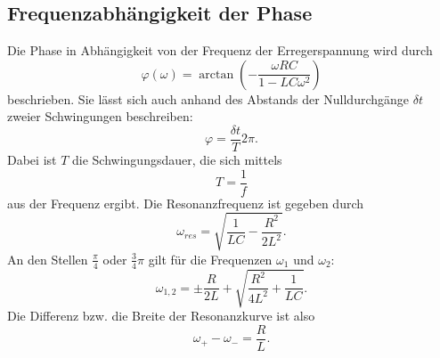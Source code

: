 \subsection{Frequenzabhängigkeit der Phase}
Die Phase in Abhängigkeit von der Frequenz der Erregerspannung wird durch
\begin{equation*}
    \varphi(\omega) = \arctan(-\frac{\omega RC}{1-LC\omega^2})
\end{equation*}
beschrieben.
Sie lässt sich auch anhand des Abstands der Nulldurchgänge $\delta t$ zweier Schwingungen beschreiben:
\begin{equation}
    \varphi = \frac{\delta t}{T} 2 \pi.
    \label{eqn:phi}
\end{equation}
Dabei ist $T$ die Schwingungsdauer, die sich mittels
\begin{equation*}
    T = \frac{1}{f}
\end{equation*}
aus der Frequenz ergibt.
Die Resonanzfrequenz ist gegeben durch
\begin{equation}
    \omega_{res} = \sqrt{\frac{1}{LC} - \frac{R^2}{2L^2}}.
    \label{eqn:omega_res}
\end{equation}
An den Stellen $\frac{\pi}{4}$ oder $\frac{3}{4} \pi$ gilt für die Frequenzen $\omega_{1}$
und $\omega_{2}$:
\begin{equation}
    \omega_{1,2} = \pm \frac{R}{2L} + \sqrt{\frac{R^2}{4L^2} + \frac{1}{LC}}.
    \label{eqn:omega_12}
\end{equation}
Die Differenz bzw. die Breite der Resonanzkurve ist also
\begin{equation}
    \omega_+ - \omega_- = \frac{R}{L}.
    \label{eqn:diff}
\end{equation}